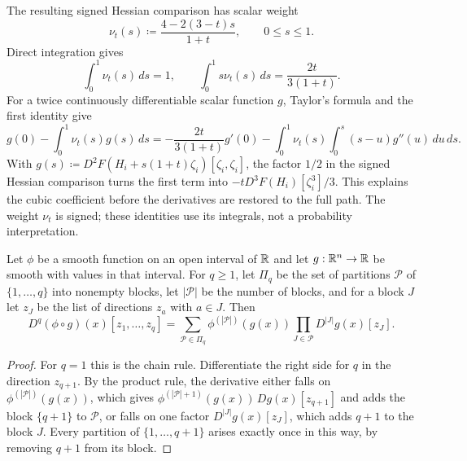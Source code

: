 
The resulting signed Hessian comparison has scalar weight
\[
 \nu_t(s)\coloneqq \frac{4-2(3-t)s}{1+t},\qquad 0\le s\le1.
\]
Direct integration gives
\[
 \int_0^1\nu_t(s)\,ds=1,\qquad
 \int_0^1s\nu_t(s)\,ds=\frac{2t}{3(1+t)}.
\]
For a twice continuously differentiable scalar function \(g\),
Taylor's formula and the first identity give
\[
 g(0)-\int_0^1\nu_t(s)g(s)\,ds
 =-\frac{2t}{3(1+t)}g'(0)
   -\int_0^1\nu_t(s)\int_0^s(s-u)g''(u)\,du\,ds.
\]
With \(g(s)\coloneqq D^2F(H_i+s(1+t)\zeta_i)[\zeta_i,\zeta_i]\),
the factor \(1/2\) in the signed Hessian comparison turns the first
term into \(-t D^3F(H_i)[\zeta_i^3]/3\). This explains the
cubic coefficient before the derivatives are restored to the full path.
The weight \(\nu_t\) is signed; these identities use its
integrals, not a probability interpretation.

\begin{fact}\label{tb:faa}
Let \(\phi\) be a smooth function on an open interval of \(\mathbb R\) and let
\(g:\mathbb R^n\to\mathbb R\) be smooth with values in that interval. For \(q\ge1\), let
\(\Pi_q\) be the set of partitions \(\mathcal P\) of \(\{1,\ldots,q\}\) into
nonempty blocks, let \(|\mathcal P|\) be the number of blocks, and for a
block \(J\) let \(z_J\) be the list of directions \(z_a\) with
\(a\in J\). Then
\[
 D^q(\phi\circ g)(x)[z_1,\ldots,z_q]
 =\sum_{\mathcal P\in\Pi_q}\phi^{(|\mathcal P|)}(g(x))
  \prod_{J\in\mathcal P}D^{|J|}g(x)[z_J].
\]
\end{fact}

\begin{proof}
For \(q=1\) this is the chain rule. Differentiate the right side for \(q\)
in the direction \(z_{q+1}\). By the product rule, the derivative either
falls on \(\phi^{(|\mathcal P|)}(g(x))\), which gives
\(\phi^{(|\mathcal P|+1)}(g(x))\,Dg(x)[z_{q+1}]\) and adds the block
\(\{q+1\}\) to \(\mathcal P\), or falls on one factor
\(D^{|J|}g(x)[z_J]\), which adds \(q+1\) to the block \(J\). Every partition
of \(\{1,\ldots,q+1\}\) arises exactly once in this way, by removing
\(q+1\) from its block.
\end{proof}

